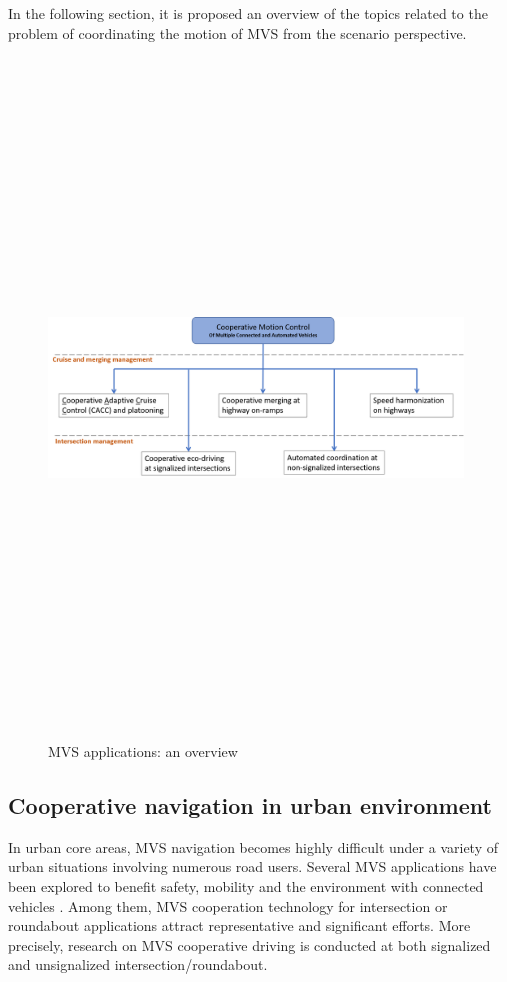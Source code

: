 In the following section, it is proposed an overview of the topics related to the problem of coordinating the motion of MVS from the scenario perspective. 


\begin{figure}[!h]
        \centering 
        \includegraphics[width=11cm,height=18cm,keepaspectratio]{chapters/Chapitre_2/Figures/Schema_cooperative.png}
        \caption{MVS applications: an overview}
        \label{fig:CAV_applications}
                \vspace{-5mm}
        \end{figure}
\subsection{Cooperative navigation in urban environment}

In urban core areas, MVS navigation becomes highly difficult under a variety of urban situations involving numerous road users. Several MVS applications have been explored to benefit safety, mobility and the environment with connected vehicles \cite{karmanska2021benefits}\cite{CAVBenefits}\cite{congestion2}. Among them, MVS cooperation technology for intersection or roundabout applications attract representative and significant efforts. More precisely, research on MVS cooperative driving is conducted at both signalized and unsignalized intersection/roundabout. 


